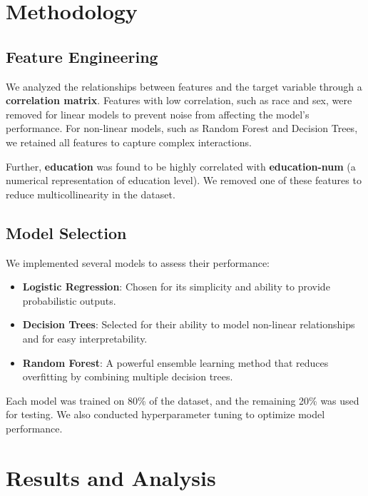 \documentclass[10pt,twocolumn,letterpaper]{article}
\begin{document}
\section{Methodology}
\label{sec:methodology}

\subsection{Feature Engineering}
We analyzed the relationships between features and the target variable through a \textbf{correlation matrix}. Features with low correlation, such as race and sex, were removed for linear models to prevent noise from affecting the model's performance. For non-linear models, such as Random Forest and Decision Trees, we retained all features to capture complex interactions.

Further, \textbf{education} was found to be highly correlated with \textbf{education-num} (a numerical representation of education level). We removed one of these features to reduce multicollinearity in the dataset.

\subsection{Model Selection}
We implemented several models to assess their performance:
\begin{itemize}
    \item \textbf{Logistic Regression}: Chosen for its simplicity and ability to provide probabilistic outputs.
    \item \textbf{Decision Trees}: Selected for their ability to model non-linear relationships and for easy interpretability.
    \item \textbf{Random Forest}: A powerful ensemble learning method that reduces overfitting by combining multiple decision trees.
\end{itemize}
Each model was trained on 80\% of the dataset, and the remaining 20\% was used for testing. We also conducted hyperparameter tuning to optimize model performance.

\section{Results and Analysis}
\label{sec:results}
\end{document}
